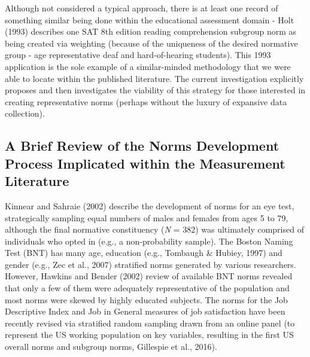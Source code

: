 \documentclass[
  ,man]{apa7}
\begin{document}
Although not considered a typical approach, there is at least one record of something similar being done within the educational assessment domain - Holt (1993) describes one SAT 8th edition reading comprehension subgroup norm as being created via weighting (because of the uniqueness of the desired normative group - age representative deaf and hard-of-hearing students). This 1993 application is the sole example of a similar-minded methodology that we were able to locate within the published literature. The current investigation explicitly proposes and then investigates the viability of this strategy for those interested in creating representative norms (perhaps without the luxury of expansive data collection).

\hypertarget{a-brief-review-of-the-norms-development-process-implicated-within-the-measurement-literature}{%
\subsection{A Brief Review of the Norms Development Process Implicated within the Measurement Literature}\label{a-brief-review-of-the-norms-development-process-implicated-within-the-measurement-literature}}

Kinnear and Sahraie (2002) describe the development of norms for an eye test, strategically sampling equal numbers of males and females from ages 5 to 79, although the final normative constituency (\emph{N} = 382) was ultimately comprised of individuals who opted in (e.g., a non-probability sample). The Boston Naming Test (BNT) has many age, education (e.g., Tombaugh \& Hubiey, 1997) and gender (e.g., Zec et al., 2007) stratified norms generated by various researchers. However, Hawkins and Bender (2002) review of available BNT norms revealed that only a few of them were adequately representative of the population and most norms were skewed by highly educated subjects. The norms for the Job Descriptive Index and Job in General measures of job satisfaction have been recently revised via stratified random sampling drawn from an online panel (to represent the US working population on key variables, resulting in the first US overall norms and subgroup norms, Gillespie et al., 2016).
\end{document}
